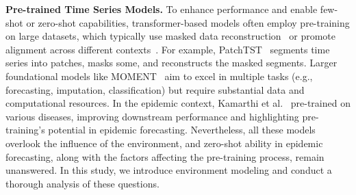 \textbf{Pre-trained Time Series Models.}
To enhance performance and enable few-shot or zero-shot capabilities, transformer-based models often employ pre-training on large datasets, which typically use masked data reconstruction~\cite{zerveas2021transformer, rasul2023lag} or promote alignment across different contexts~\cite{fraikin2023t, zhang2022self, yue2022ts2vec}. For example, PatchTST~\cite{nie2022time} segments time series into patches, masks some, and reconstructs the masked segments. Larger foundational models like MOMENT~\cite{goswami2024moment} aim to excel in multiple tasks (e.g., forecasting, imputation, classification) but require substantial data and computational resources. In the epidemic context, Kamarthi et al.~\cite{kamarthi2023pems} pre-trained on various diseases, improving downstream performance and highlighting pre-training's potential in epidemic forecasting. Nevertheless, all these models overlook the influence of the environment, and zero-shot ability in epidemic forecasting, along with the factors affecting the pre-training process, remain unanswered. In this study, we introduce environment modeling and conduct a thorough analysis of these questions.



